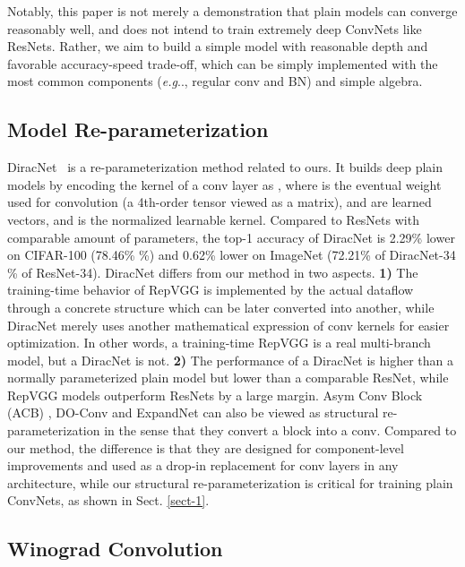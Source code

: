 \documentclass[final]{cvpr}
\makeatletter
\DeclareRobustCommand\onedot{\futurelet\@let@token\@onedot}
\def\@onedot{\ifx\@let@token.\else.\null\fi\xspace}
\def\eg{\emph{e.g}\onedot}
\makeatother
\begin{document}
Notably, this paper is not merely a demonstration that plain models can converge reasonably well, and does not intend to train extremely deep ConvNets like ResNets. Rather, we aim to build a simple model with reasonable depth and favorable accuracy-speed trade-off, which can be simply implemented with the most common components (\eg, regular conv and BN) and simple algebra. 

\subsection{Model Re-parameterization}

DiracNet~\cite{zagoruyko2017diracnets} is a re-parameterization method related to ours. It builds deep plain models by encoding the kernel of a conv layer as , where  is the eventual weight used for convolution (a 4th-order tensor viewed as a matrix),  and  are learned vectors, and  is the normalized learnable kernel. Compared to ResNets with comparable amount of parameters, the top-1 accuracy of DiracNet is 2.29\% lower on CIFAR-100 (78.46\% \%) and 0.62\% lower on ImageNet (72.21\% of DiracNet-34 \% of ResNet-34). DiracNet differs from our method in two aspects. \textbf{1)} The training-time behavior of RepVGG is implemented by the actual dataflow through a concrete structure which can be later converted into another, while DiracNet merely uses another mathematical expression of conv kernels for easier optimization. In other words, a training-time RepVGG is a real multi-branch model, but a DiracNet is not. \textbf{2)} The performance of a DiracNet is higher than a normally parameterized plain model but lower than a comparable ResNet, while RepVGG models outperform ResNets by a large margin. Asym Conv Block (ACB) \cite{ding2019acnet}, DO-Conv \cite{cao2020conv} and ExpandNet \cite{guo2020expandnets} can also be viewed as structural re-parameterization in the sense that they convert a block into a conv. Compared to our method, the difference is that they are designed for component-level improvements and used as a drop-in replacement for conv layers in any architecture, while our structural re-parameterization is critical for training plain ConvNets, as shown in Sect. \ref{sect-1}.


\subsection{Winograd Convolution}\label{sect-wino}
\end{document}
